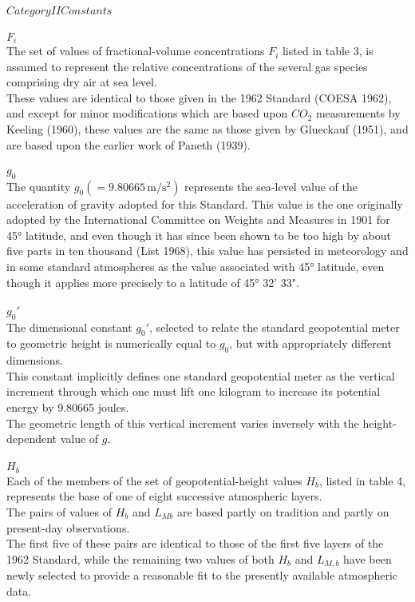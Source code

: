 \documentclass{article}
\begin{document}
$Category II Constants$\\
\\$F_i$\\
The set of values of fractional-volume concentrations $F_i$ listed in table 3, is assumed to represent the relative concentrations of the several gas species comprising dry air at sea level.\\
These values are identical to those given in the 1962 Standard (COESA 1962), and except for minor modifications which are based upon $CO_2$ measurements by Keeling (1960), these values are the same as those given by Glueckauf (1951), and are based upon the earlier work of Paneth (1939).\\
\\$g_0$\\
The quantity $g_0 (= 9.80665 \, \mathrm{m/s^2})$ represents the sea-level value of the acceleration of gravity adopted for this Standard. This value is the one originally adopted by the International Committee on Weights and Measures in 1901 for 45° latitude, and even though it has since been shown to be too high by about five parts in ten thousand (List 1968), this value has persisted in meteorology and in some standard atmospheres as the value associated with 45° latitude, even though it applies more precisely to a latitude of 45° 32' 33".\\
\\$g_0\text{$'$}$\\
The dimensional constant $g_0\text{$'$}$, selected to relate the standard geopotential meter to geometric height is numerically equal to $g_0$, but with appropriately different dimensions.\\
This constant implicitly defines one standard geopotential meter as the vertical increment through which one must lift one kilogram to increase its potential energy by 9.80665 joules.\\
The geometric length of this vertical increment varies inversely with the height-dependent value of $g$.\\
\\$H_b$\\
Each of the members of the set of geopotential-height values $H_b$, listed in table 4, represents the base of one of eight successive atmospheric layers.\\
The pairs of values of $H_b$ and $L_{Mb}$ are based partly on tradition and partly on present-day observations.\\
The first five of these pairs are identical to those of the first five layers of the 1962 Standard, while the remaining two values of both $H_b$ and $L_{M,b}$ have been newly selected to provide a reasonable fit to the presently available atmospheric data.\\
\end{document}

